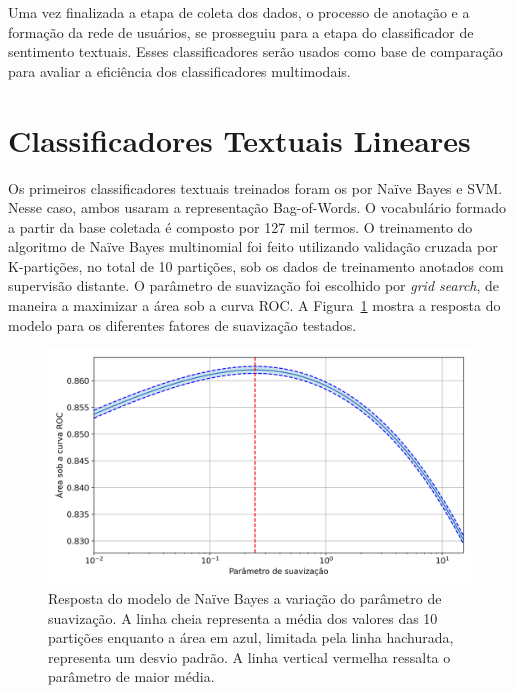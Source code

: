Uma vez finalizada a etapa de coleta dos dados, o processo de anotação e a
formação da rede de usuários, se prosseguiu para a etapa do classificador de
sentimento textuais.
Esses classificadores serão usados como base de comparação para avaliar a
eficiência dos classificadores multimodais.

\section{Classificadores Textuais Lineares}

Os primeiros classificadores textuais treinados foram os por Naïve Bayes e SVM.
Nesse caso, ambos usaram a representação Bag-of-Words.
O vocabulário formado a partir da base coletada é composto por 127 mil termos.
O treinamento do algoritmo de Naïve Bayes multinomial foi feito utilizando
validação cruzada por K-partições, no total de 10 partições, sob os dados de
treinamento anotados com supervisão distante. O parâmetro de suavização foi
escolhido por \textit{grid search}, de maneira a maximizar a área sob a curva ROC.
A Figura~\ref{fig:nb_grid} mostra a resposta do modelo para os diferentes fatores
de suavização testados.

\begin{figure}[h!]
\begin{center} {
    \begin{center}
    \includegraphics[scale=0.65]{images/nb_grid.png}
    \caption{Resposta do modelo de Naïve Bayes a variação do parâmetro de suavização.
             A linha cheia representa a média dos valores das 10 partições
             enquanto a área em azul, limitada pela linha hachurada, representa um desvio padrão.
             A linha vertical vermelha ressalta o parâmetro de maior média.}
    \label{fig:nb_grid}
    \end{center}
}
\end{center}
\end{figure}

